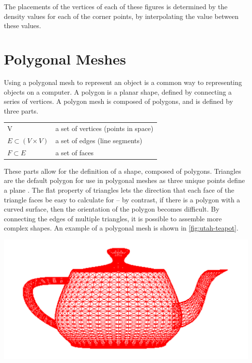 \documentclass[10pt]{report}
\begin{document}
		The placements of the vertices of each of these figures is determined by the density values for each of the corner points, by interpolating the value between these values.	
	
		\section{Polygonal Meshes}
	
		Using a polygonal mesh to represent an object is a common way to representing objects on a computer. A polygon is a planar shape, defined by connecting a series of vertices. A polygon mesh is composed of polygons, and is defined by three parts.
		
		\begin{center}
			\begin{tabular}{ l l } 
				V & a set of vertices (points in space)\\ 
				$E {\subset} (V \times V)$ & a set of edges (line segments)\\ 
				$F {\subset} E$  & a set of faces \\
			\end{tabular}
		\end{center}
	
		These parts allow for the definition of a shape, composed of polygons. Triangles are the default polygon for use in polygonal meshes as three unique points define a plane \cite{polygon}. The flat property of triangles lets the direction that each face of the triangle faces be easy to calculate for -- by contrast, if there is a polygon with a curved surface, then the orientation of the polygon becomes difficult. By connecting the edges of multiple triangles, it is possible to assemble more complex shapes. An example of a polygonal mesh is shown in \autoref{fig:utah-teapot}.
		
		\begin{minipage}{\textwidth}
			\centering
			\includegraphics[scale=0.3]{utah-teapot}
			\label{fig:utah-teapot}
		\end{minipage}	
	
\end{document}
